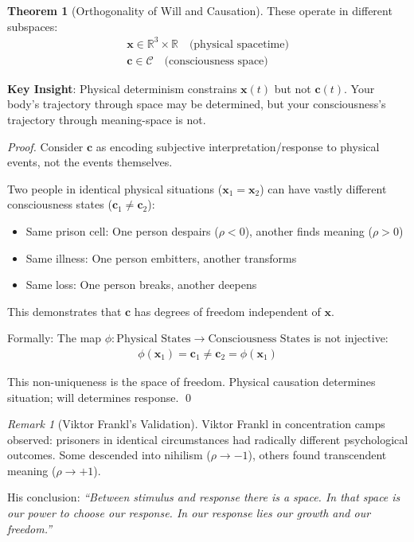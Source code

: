 \documentclass[11pt,a4paper]{article}
\theoremstyle{definition}
\newtheorem{theorem}{Theorem}[section]
\theoremstyle{remark}
\newtheorem{remark}{Remark}[section]
\newcommand{\RR}{\mathbb{R}}
\newcommand{\CC}{\mathcal{C}}
\newcommand{\cc}{\mathbf{c}}
\begin{document}
\begin{small}
\begin{enumerate}
\begin{theorem}[Orthogonality of Will and Causation]
These operate in different subspaces:
\begin{align}
\mathbf{x} \in \RR^3 \times \RR \quad \text{(physical spacetime)} \\
\cc \in \CC \quad \text{(consciousness space)}
\end{align}

\textbf{Key Insight}: Physical determinism constrains \(\mathbf{x}(t)\) but not \(\cc(t)\). Your body's trajectory through space may be determined, but your consciousness's trajectory through meaning-space is not.
\end{theorem}

\begin{proof}
Consider \(\cc\) as encoding subjective interpretation/response to physical events, not the events themselves.

Two people in identical physical situations (\(\mathbf{x}_1 = \mathbf{x}_2\)) can have vastly different consciousness states (\(\cc_1 \neq \cc_2\)):
\begin{itemize}
    \item Same prison cell: One person despairs (\(\rho < 0\)), another finds meaning (\(\rho > 0\))
    \item Same illness: One person embitters, another transforms
    \item Same loss: One person breaks, another deepens
\end{itemize}

This demonstrates that \(\cc\) has degrees of freedom independent of \(\mathbf{x}\).

Formally: The map \(\phi: \text{Physical States} \to \text{Consciousness States}\) is not injective:
\begin{align}
\phi(\mathbf{x}_1) = \cc_1 \neq \cc_2 = \phi(\mathbf{x}_1)
\end{align}

This non-uniqueness is the space of freedom. Physical causation determines situation; will determines response. \qed
\end{proof}

\begin{remark}[Viktor Frankl's Validation]
Viktor Frankl in concentration camps observed: prisoners in identical circumstances had radically different psychological outcomes. Some descended into nihilism (\(\rho \to -1\)), others found transcendent meaning (\(\rho \to +1\)).

His conclusion: \textit{``Between stimulus and response there is a space. In that space is our power to choose our response. In our response lies our growth and our freedom.''}


\end{remark}
\end{enumerate}
\end{small}
\end{document}

